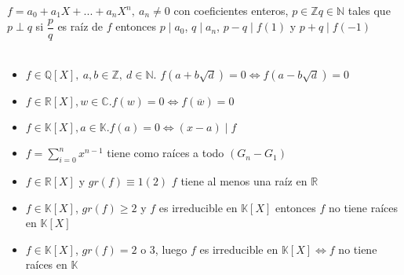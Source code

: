 \documentclass[a4paper,10pt]{article}
\begin{document}
\teorema $f = a_0 + a_1 X + ... + a_n X^{n}, \ a_n \neq 0 $ con coeficientes enteros, $p \in \mathbb{Z} q \in \mathbb{N}$ tales que $p \perp q$ si $\dfrac{p}{q}$ es raíz de $f$ entonces $p \mid a_0$, $q \mid a_n$, $p-q \mid f(1)$ y $p+q \mid f(-1)$ \\ \\
\clearpage

\propiedades
\begin{itemize}
	\item $f \in \mathbb{Q}[X], \ a,b \in \mathbb{Z}, \ d \in \mathbb{N}$. $f(a+b\sqrt{d})=0 \Leftrightarrow f(a-b\sqrt{d}) = 0$
	\item $f \in \mathbb{R}[X], w \in \mathbb{C}. f(w) = 0 \Leftrightarrow f(\overline{w}) = 0$
	\item $f \in \mathbb{K}[X], a \in \mathbb{K}. f(a) = 0 \Leftrightarrow (x-a) \mid f$
	\item $\displaystyle f = \sum_{i=0}^{n} {x^{n-1}}$ tiene como raíces a todo $(G_{n}-G_{1})$
	\item $f \in \mathbb{R}[X]$ y $gr(f) \equiv 1 (2)$ $f$ tiene al menos una raíz en $\mathbb{R}$
	\item $f \in \mathbb{K}[X]$, $gr(f) \geq 2$ y $f$ es irreducible en $\mathbb{K}[X]$ entonces $f$ no tiene raíces en $\mathbb{K}[X]$
	\item $f \in \mathbb{K}[X]$, $gr(f) = 2 \mbox{ o } 3$, luego $f$ es irreducible en $\mathbb{K}[X] \Leftrightarrow f$ no tiene raíces en $\mathbb{K}$
\end{itemize}


\clearpage
\end{document}
